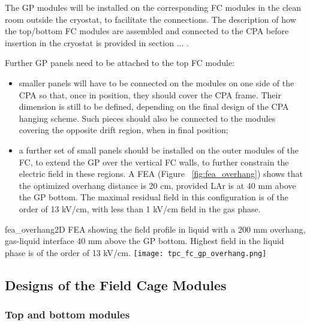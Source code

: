 The GP modules will be installed on the corresponding FC modules in the clean room outside the cryostat, to facilitate the connections. The description of how the top/bottom FC modules are assembled and connected to the CPA before insertion in the cryostat is provided in section ... .

Further GP panels need to be attached to the top FC module:
\begin{itemize}
\item smaller panels will have to be connected on the modules on one side of the CPA so that, once in position, they should cover the CPA frame. Their dimension is still to be defined, depending on the final design of the CPA hanging scheme. Such pieces should also be connected to the modules covering the opposite drift region, when in final position;
\item a further set of small panels should be installed on the outer modules of the FC, to extend the GP over the vertical FC walls, to further constrain the electric field in these regions. A FEA (Figure ~\ref{fig:fea_overhang}) shows that the optimized overhang distance is 20 cm, provided LAr is at 40 mm above the GP bottom. The maximal residual field in this configuration is of the order of 13 kV/cm, with less than 1 kV/cm field in the gas phase.
\end{itemize}

\begin{cdrfigure}{fea_overhang}{2D FEA showing the field profile in liquid with a 200 mm overhang, gas-liquid interface 40 mm above the GP bottom. Highest field in the liquid phase is of the order of 13 kV/cm.}
\texttt{[image: tpc\_fc\_gp\_overhang.png]}
\end{cdrfigure}








\subsection{Designs of the Field Cage Modules}

\subsubsection{Top and bottom modules}




